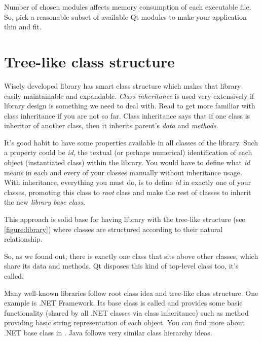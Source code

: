Number of chosen modules affects memory consumption of each executable file. So, pick a reasonable subset of available Qt modules to make your application thin and fit.

\section{Tree-like class structure}
Wisely developed library has smart class structure which makes that library easily maintainable and expandable. \textit{Class inheritance} is used very extensively if library design is something we need to deal with. Read \citep[p.~708-783]{prata:cprimer} to get more familiar with \cpp class inheritance if you are not so far. Class inheritance says that if one class is inheritor of another class, then it inherits parent's \textit{data} and \textit{methods}.

It's good habit to have some properties available in all classes of the library. Such a property could be \eg \textit{id}, the textual (or perhaps numerical) identification of each object (instantiated class) within the library. You would have to define what \textit{id} means in each and every of your classes manually without inheritance usage. With inheritance, everything you must do, is to define \textit{id} in exactly one of your classes, promoting this class to \textit{root} class and make the rest of classes to inherit the new \textit{library base class}.

This approach is solid base for having library with the tree-like structure (see \autoref{figure:library}) where classes are structured according to their natural relationship.

So, as we found out, there is exactly one class that sits above other classes, which share its data and methods. Qt disposes this kind of top-level class too, it's called.

\begin{fdocextra}
Many well-known libraries follow root class idea and tree-like class structure. One example is .NET Framework. Its base class is called and provides some basic functionality (shared by all .NET classes via class inheritance) such as method providing basic string representation of each object. You can find more about .NET base class in \citep[p.~84]{nigel:csharp}. Java follows very similar class hierarchy ideas.
\end{fdocextra}

